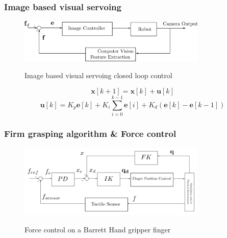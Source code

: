 \begin{frame}
\frametitle{Image based visual servoing}

\begin{center}
\begin{figure}[!htb]
\centering
\includegraphics[width=0.8\textwidth]{../images/visual-servoing-image-based.png}\\
\caption{Image based visual servoing closed loop control}
\label{visual-servoing-image-based-control}
\end{figure}

\[
\mathbf{x}[k+1] = \mathbf{x}[k] + \mathbf{u}[k]
\]
\[
\mathbf{u}[k] = K_p\mathbf{e}[k] + K_i \sum_{i=0}^{k-1} \mathbf{e}[i] + K_d \left( \mathbf{e}[k] - \mathbf{e}[k-1] \right)
\]
\end{center}
\end{frame}


\begin{frame}
\frametitle{Firm grasping algorithm \& Force control}
\begin{center}
\begin{figure}[!htb]
\centering
\includegraphics[width=0.8\textwidth]{../images/finger-force-control.png}\\
\caption{Force control on a Barrett Hand gripper finger}
\label{finger-force-control}
\end{figure}
\end{center}
\end{frame}

